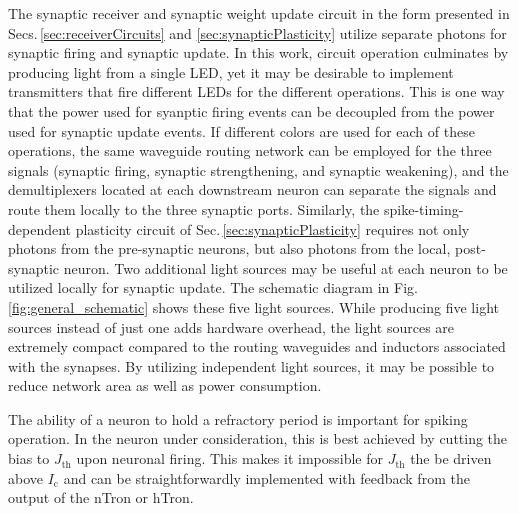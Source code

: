 \documentclass[twocolumn]{article}
\begin{document}
The synaptic receiver and synaptic weight update circuit in the form presented in Secs.\,\ref{sec:receiverCircuits} and \ref{sec:synapticPlasticity} utilize separate photons for synaptic firing and synaptic update. In this work, circuit operation culminates by producing light from a single LED, yet it may be desirable to implement transmitters that fire different LEDs for the different operations. This is one way that the power used for syanptic firing events can be decoupled from the power used for synaptic update events. If different colors are used for each of these operations, the same waveguide routing network can be employed for the three signals (synaptic firing, synaptic strengthening, and synaptic weakening), and the demultiplexers located at each downstream neuron can separate the signals and route them locally to the three synaptic ports. Similarly, the spike-timing-dependent plasticity circuit of Sec.\,\ref{sec:synapticPlasticity} requires not only photons from the pre-synaptic neurons, but also photons from the local, post-synaptic neuron. Two additional light sources may be useful at each neuron to be utilized locally for synaptic update. The schematic diagram in Fig.\,\ref{fig:general_schematic} shows these five light sources. While producing five light sources instead of just one adds hardware overhead, the light sources are extremely compact compared to the routing waveguides and inductors associated with the synapses. By utilizing independent light sources, it may be possible to reduce network area as well as power consumption.

The ability of a neuron to hold a refractory period is important for spiking operation. In the neuron under consideration, this is best achieved by cutting the bias to $J_{\mathrm{th}}$ upon neuronal firing. This makes it impossible for $J_{\mathrm{th}}$ the be driven above $I_{\mathrm{c}}$ and can be straightforwardly implemented with feedback from the output of the nTron or hTron.
\end{document}
